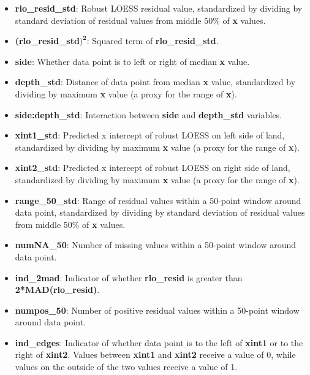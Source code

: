 \documentclass[12pt]{article}
\begin{document}
\begin{itemize}

\item[] \textbf{rlo\_resid\_std}: Robust LOESS residual value, standardized by dividing by standard deviation of residual values from middle 50\% of \textbf{x} values.  

\item[] \textbf{(rlo\_resid\_std$\mathbf{)^2}$}: Squared term of \textbf{rlo\_resid\_std}.  

\item[] \textbf{side}: Whether data point is to left or right of median \textbf{x} value.  

\item[] \textbf{depth\_std}: Distance of data point from median \textbf{x} value, standardized by dividing by maximum \textbf{x} value (a proxy for the range of \textbf{x}).  

\item[] \textbf{side:depth\_std}: Interaction between \textbf{side} and \textbf{depth\_std} variables.  

\item[] \textbf{xint1\_std}: Predicted x intercept of robust LOESS on left side of land, standardized by dividing by maximum \textbf{x} value (a proxy for the range of \textbf{x}).  

\item[] \textbf{xint2\_std}: Predicted x intercept of robust LOESS on right side of land, standardized by dividing by maximum \textbf{x} value (a proxy for the range of \textbf{x}).  

\item[] \textbf{range\_50\_std}: Range of residual values within a 50-point window around data point, standardized by dividing by standard deviation of residual values from middle 50\% of \textbf{x} values.  

\item[] \textbf{numNA\_50}: Number of missing values within a 50-point window around data point.  

\item[] \textbf{ind\_2mad}: Indicator of whether \textbf{rlo\_resid} is greater than \textbf{2*MAD(rlo\_resid)}.  

\item[] \textbf{numpos\_50}: Number of positive residual values within a 50-point window around data point.  

\item[] \textbf{ind\_edges}: Indicator of whether data point is to the left of \textbf{xint1} or to the right of \textbf{xint2}. Values between \textbf{xint1} and \textbf{xint2} receive a value of 0, while values on the outside of the two values receive a value of 1.  

\end{itemize}
\end{document}
